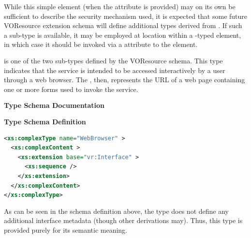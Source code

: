 \documentclass[11pt,a4paper]{ivoa}
\begin{document}

While this simple element (when the  attribute
is provided) may on its own be sufficient to describe the security
mechanism used, it is expected that some future
VOResource extension schema will define
additional types derived from .  If such
a sub-type is available, it may be employed at
 location within a
-typed element, in which case it should be
invoked via a  attribute to the
 element.  


 is one of the two 
sub-types defined by the VOResource schema.  This type indicates that
the service is intended to be accessed interactively by a user through
a web browser.  The , then, represents
the URL of a web page containing one or more forms used to invoke the
service. 


\begin{generated}
\begingroup
      	\renewcommand*\descriptionlabel[1]{%
      	\hbox to 5.5em{\emph{#1}\hfil}}\vspace{2ex}\noindent\textbf{ Type Schema Documentation}



\vspace{1ex}\noindent\textbf{ Type Schema Definition}

\begin{lstlisting}[language=XML,basicstyle=\footnotesize]
<xs:complexType name="WebBrowser" >
  <xs:complexContent >
    <xs:extension base="vr:Interface" >
      <xs:sequence />
    </xs:extension>
  </xs:complexContent>
</xs:complexType>
\end{lstlisting}\endgroup
\end{generated}



As can be seen in the schema definition above, the
 type does not define any additional
interface metadata (though other  derivations
may).  Thus, this type is provided purely for its semantic meaning.  
\end{document}
